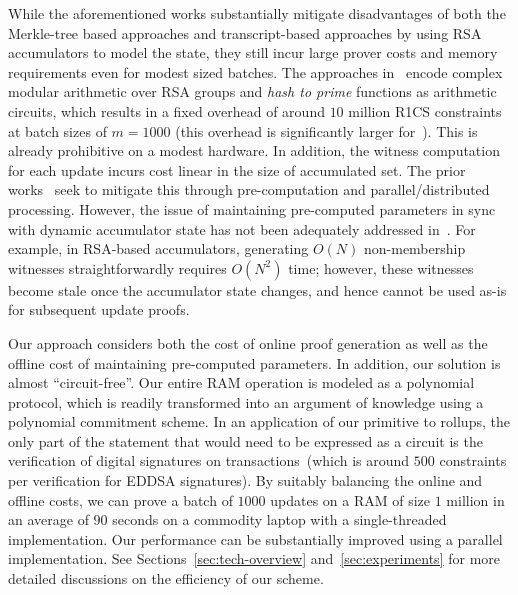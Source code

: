 While the aforementioned works substantially mitigate disadvantages of both the
Merkle-tree based approaches and transcript-based approaches by using RSA accumulators to model the state,
they still incur large prover costs and memory requirements even for modest sized batches. The approaches
in~\cite{USENIX:OWWB20,CCS:CFHKKO22} encode complex modular arithmetic over RSA groups and {\em hash
to prime} functions as arithmetic circuits, which results in a fixed overhead of around $10$ million R1CS constraints
at batch sizes of $m=1000$ (this overhead is significantly larger for~\cite{USENIX:OWWB20}). This is already prohibitive on a modest hardware. In addition, the witness computation for each update incurs cost
linear in the size of accumulated set. The prior works~\cite{USENIX:OWWB20,CCS:CFHKKO22} seek to mitigate this through pre-computation and
parallel/distributed processing. However, the issue of maintaining pre-computed parameters in sync with dynamic accumulator state has not been adequately addressed in~\cite{USENIX:OWWB20,CCS:CFHKKO22}. For example, in RSA-based accumulators, generating $O(N)$ non-membership witnesses straightforwardly requires $O(N^2)$ time; however, these witnesses become stale once the accumulator state changes, and hence cannot be used as-is for subsequent update proofs. 

Our approach considers both the cost of online proof generation as well as the offline cost of maintaining pre-computed parameters. In addition, our solution is almost ``circuit-free''. Our entire RAM operation is modeled as a polynomial protocol, which is readily transformed into an argument of
knowledge using a polynomial commitment scheme. In an application of our primitive to rollups, the only part of the statement 
that would need to be expressed as a circuit is the verification of digital signatures on transactions~(which is around $500$ constraints per verification for EDDSA signatures). By suitably balancing the online and offline costs, we can prove a batch of $1000$ updates on a RAM of size $1$ million in an average of $90$ seconds on a commodity laptop with a single-threaded implementation. Our performance can be substantially improved using a parallel implementation. See Sections~\ref{sec:tech-overview} and~\ref{sec:experiments}  for more detailed discussions on the efficiency of our scheme. 



